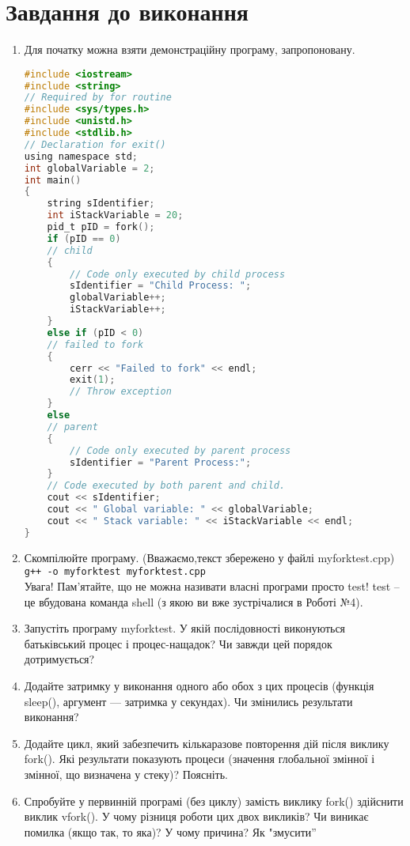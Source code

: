 \documentclass{article}
\begin{document}
 
\large

\section{Завдання до виконання}
\begin{enumerate}
	\item Для початку можна взяти демонстраційну програму, запропоновану.
	\begin{lstlisting}[language=C]
#include <iostream>
#include <string>
// Required by for routine
#include <sys/types.h>
#include <unistd.h>
#include <stdlib.h>
// Declaration for exit()
using namespace std;
int globalVariable = 2;
int main()
{
	string sIdentifier;
	int iStackVariable = 20;
	pid_t pID = fork();
	if (pID == 0)
	// child
	{
		// Code only executed by child process
		sIdentifier = "Child Process: ";
		globalVariable++;
		iStackVariable++;
	}
	else if (pID < 0)
	// failed to fork
	{
		cerr << "Failed to fork" << endl;
		exit(1);
		// Throw exception
	}
	else
	// parent
	{
		// Code only executed by parent process
		sIdentifier = "Parent Process:";
	}
	// Code executed by both parent and child.
	cout << sIdentifier;
	cout << " Global variable: " << globalVariable;
	cout << " Stack variable: " << iStackVariable << endl;
}
\end{lstlisting}
	\item Скомпілюйте програму. (Вважаємо,текст збережено у файлі myforktest.cpp) \\
	\texttt{g++ -o myforktest myforktest.cpp} \\
	Увага! Пам’ятайте, що не можна називати власні програми просто
	test! test – це вбудована команда shell (з якою ви вже зустрічалися
	в Роботі №4).
	\item Запустіть програму myforktest. У якій послідовності виконуються
	батьківський процес і процес-нащадок? Чи завжди цей порядок
	дотримується?
	\item Додайте затримку у виконання одного або обох з цих процесів
	(функція sleep(), аргумент — затримка у секундах). Чи змінились
	результати виконання?
	\item Додайте цикл, який забезпечить кількаразове повторення дій після
	виклику fork(). Які результати показують процеси (значення
	глобальної змінної і змінної, що визначена у стеку)? Поясніть.
	\item Спробуйте у первинній програмі (без циклу) замість виклику fork()
	здійснити виклик vfork(). У чому різниця роботи цих двох викликів?
	Чи виникає помилка (якщо так, то яка)? У чому причина? Як "змусити”

\end{enumerate}
\end{document}
